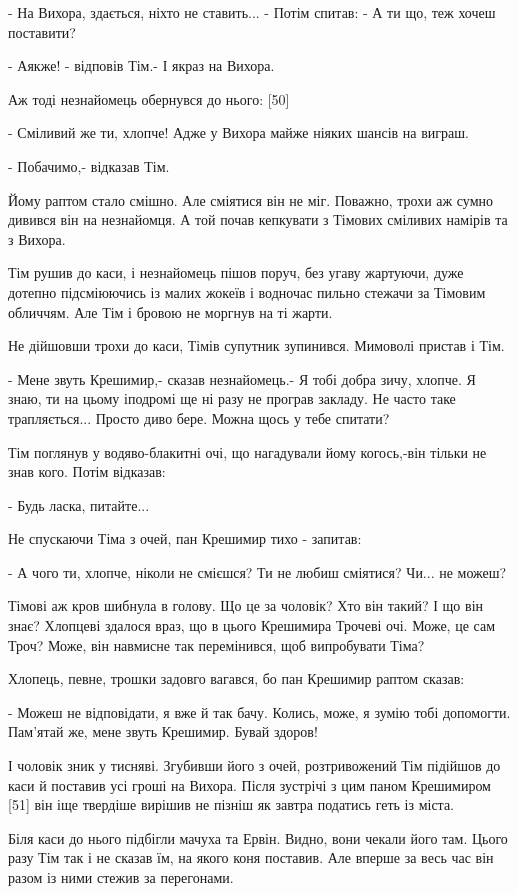 - На Вихора, здається, ніхто не ставить... - Потім спитав: - А ти що, теж хочеш поставити?

- Аякже! - відповів Тім.- І якраз на Вихора.

Аж тоді незнайомець обернувся до нього: [50]

- Сміливий же ти, хлопче! Адже у Вихора майже ніяких шансів на виграш.

- Побачимо,- відказав Тім.

Йому раптом стало смішно. Але сміятися він не міг. Поважно, трохи аж сумно дивився він на незнайомця. А той почав кепкувати з Тімових сміливих намірів та з Вихора.

Тім рушив до каси, і незнайомець пішов поруч, без угаву жартуючи, дуже дотепно підсміюючись із малих жокеїв і водночас пильно стежачи за Тімовим обличчям. Але Тім і бровою не моргнув на ті жарти.

Не дійшовши трохи до каси, Тімів супутник зупинився. Мимоволі пристав і Тім.

- Мене звуть Крешимир,- сказав незнайомець.- Я тобі добра зичу, хлопче. Я знаю, ти на цьому іподромі ще ні разу не програв закладу. Не часто таке трапляється... Просто диво бере. Можна щось у тебе спитати?

Тім поглянув у водяво-блакитні очі, що нагадували йому когось,-він тільки не знав кого. Потім відказав:

- Будь ласка, питайте...

Не спускаючи Тіма з очей, пан Крешимир тихо - запитав:

- А чого ти, хлопче, ніколи не смієшся? Ти не любиш сміятися? Чи... не можеш?

Тімові аж кров шибнула в голову. Що це за чоловік? Хто він такий? І що він знає? Хлопцеві здалося враз, що в цього Крешимира Трочеві очі. Може, це сам Троч? Може, він навмисне так перемінився, щоб випробувати Тіма?

Хлопець, певне, трошки задовго вагався, бо пан Крешимир раптом сказав:

- Можеш не відповідати, я вже й так бачу. Колись, може, я зумію тобі допомогти. Пам'ятай же, мене звуть Крешимир. Бувай здоров!

І чоловік зник у тисняві. Згубивши його з очей, розтривожений Тім підійшов до каси й поставив усі гроші на Вихора. Після зустрічі з цим паном Крешимиром [51] він іще твердіше вирішив не пізніш як завтра податись геть із міста.

Біля каси до нього підбігли мачуха та Ервін. Видно, вони чекали його там. Цього разу Тім так і не сказав їм, на якого коня поставив. Але вперше за весь час він разом із ними стежив за перегонами.

